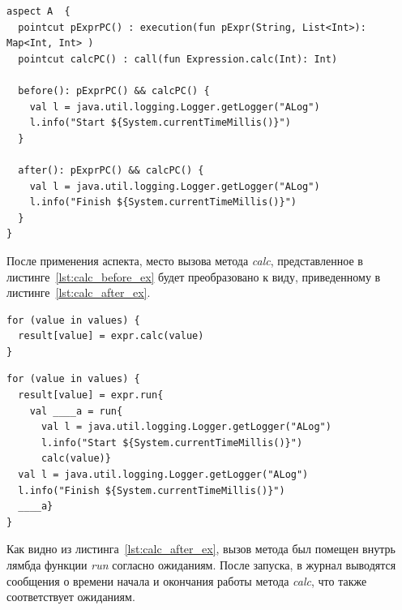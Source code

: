 \documentclass[conference]{IEEEtran}
\begin{document}
\begin{lstlisting}[label=lst:log_aspect_ex,
    caption={Пример аспекта, используемого для логирования вызова метода calc}]
aspect A  {
  pointcut pExprPC() : execution(fun pExpr(String, List<Int>): Map<Int, Int> )
  pointcut calcPC() : call(fun Expression.calc(Int): Int)

  before(): pExprPC() && calcPC() {
    val l = java.util.logging.Logger.getLogger("ALog")
    l.info("Start ${System.currentTimeMillis()}")
  }

  after(): pExprPC() && calcPC() {
    val l = java.util.logging.Logger.getLogger("ALog")
    l.info("Finish ${System.currentTimeMillis()}")
  }
}
\end{lstlisting}

После применения аспекта, место вызова метода \textit{calc}, представленное в
листинге~\ref{lst:calc_before_ex} будет преобразовано к виду, приведенному в
листинге~\ref{lst:calc_after_ex}.
\begin{lstlisting}[label=lst:calc_before_ex,
    caption={Место вызова метода calc до применения аспекта}]
for (value in values) {
  result[value] = expr.calc(value)
}
\end{lstlisting}

\begin{lstlisting}[label=lst:calc_after_ex,
    caption={Место вызова метода calc после применения аспекта}]
for (value in values) {
  result[value] = expr.run{
    val ____a = run{
      val l = java.util.logging.Logger.getLogger("ALog")
      l.info("Start ${System.currentTimeMillis()}")
      calc(value)}
  val l = java.util.logging.Logger.getLogger("ALog")
  l.info("Finish ${System.currentTimeMillis()}")
  ____a}
}
\end{lstlisting}

Как видно из листинга~\ref{lst:calc_after_ex}, вызов метода был помещен внутрь
лямбда функции \textit{run} согласно ожиданиям.
После запуска, в журнал выводятся сообщения о времени начала и окончания работы
метода \textit{calc}, что также соответствует ожиданиям.

\end{document}
